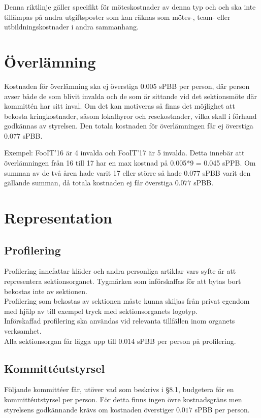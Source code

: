 \documentclass[11pt, includeaddress]{classes/cthit}
\begin{document}
Denna riktlinje gäller specifikt för möteskostnader av denna typ och och ska inte tillämpas på andra utgiftsposter som kan räknas som mötes-, team- eller utbildningskostnader i andra sammanhang.

\section{Överlämning}
Kostnaden för överlämning ska ej överstiga $0.005$ sPBB per person, där person avser både de som blivit invalda och de som är sittande vid det sektionsmöte där kommittén har sitt inval. Om det kan motiveras så finns det möjlighet att bekosta kringkostnader, såsom lokalhyror och resekostnader, vilka skall i förhand godkännas av styrelsen. Den totala kostnaden för överlämningen får ej överstiga $0.077$ sPBB.

Exempel: FooIT’16 är 4 invalda och FooIT’17 är 5 invalda. Detta innebär att överlämningen från 16 till 17 har en max kostnad på 0.005*9 = 0.045 sPPB. Om summan av de två åren hade varit 17 eller större så hade $0.077$ sPBB varit den gällande summan, då totala kostnaden ej får överstiga $0.077$ sPBB.

\section{Representation}

\subsection{Profilering}
Profilering innefattar kläder och andra personliga artiklar vars syfte är att representera sektionsorganet. 
Tygmärken som införskaffas för att bytas bort bekostas inte av sektionen. \\

Profilering som bekostas av sektionen måste kunna skiljas från privat egendom med hjälp av till exempel tryck med sektionsorganets logotyp. \\

Införskaffad profilering ska användas vid relevanta tillfällen inom organets verksamhet. \\

Alla sektionsorgan får lägga upp till $0.014$ sPBB per person på profilering.

\subsection{Kommittéutstyrsel}
Följande kommittéer får, utöver vad som beskrivs i §8.1, budgetera för en kommittéutstyrsel per person. 
För detta finns ingen övre kostnadsgräns men styrelsens godkännande krävs om kostnaden överstiger $0.017$ sPBB per person. \\
\end{document}
